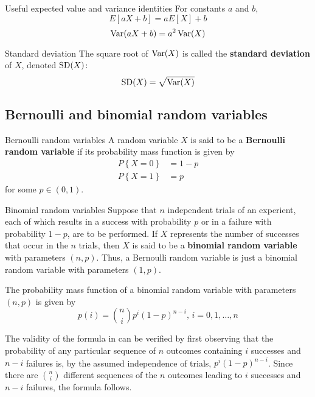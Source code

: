 \begin{bdef}{Useful expected value and variance identities}\label{varianceident}
    For constants $a$ and $b$, \[
        E\left[ aX + b \right] = aE\left[ X \right] + b   
    \] \[
        \operatorname{Var}(aX + b) = a^2\operatorname{Var}(X)
    \]
\end{bdef}
\begin{bdef}{Standard deviation}\label{standarddeviation}
    The square root of $\operatorname{Var}(X)$ is called the \textbf{standard deviation} of $X$, denoted $\operatorname{SD}(X)$: \[
        \operatorname{SD}(X) = \sqrt{\operatorname{Var}(X)}    
    \]
\end{bdef}

\pagebreak
\subsection{Bernoulli and binomial random variables}
\begin{bdef}{Bernoulli random variables}\label{bernoullirandom}
    A random variable $X$ is said to be a \textbf{Bernoulli random variable} if its probability mass function is given by \[
        \begin{aligned}
            P\left\{ X = 0 \right\} &= 1 - p \\
            P\left\{ X = 1 \right\} &= p
        \end{aligned}    
    \] for some $p \in \left( 0, 1 \right)$.
\end{bdef}
\begin{bdef}{Binomial random variables}\label{binomialrandom}
    Suppose that $n$ independent trials of an experient, each of which results in a success with probability $p$ or in a failure with probability $1 - p$, are to be performed. If $X$ represents the number of successes that occur in the $n$ trials, then $X$ is said to be a \textbf{binomial random variable} with parameters $(n, p)$. Thus, a Bernoulli random variable is just a binomial random variable with parameters $(1, p)$.

    The probability mass function of a binomial random variable with parameters $(n, p)$ is given by \[
        p(i) = \binom{n}{i}p^i(1 - p)^{n - i},\, i = 0, 1, \dots, n    
    \]
\end{bdef}
The validity of the formula in  can be verified by first observing that the probability of any particular sequence of $n$ outcomes containing $i$ successes and $n - i$ failures is, by the assumed independence of trials, $p^i(1 - p)^{n - i}$. Since there are $\binom{n}{i}$ different sequences of the $n$ outcomes leading to $i$ successes and $n - i$ failures, the formula follows.

